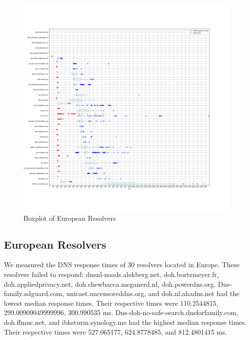 \begin{figure}[!t]
  \includegraphics[width=\linewidth]{figures/100_Europe.png}
  \caption{Boxplot of European Resolvers}
  \label{fig:EurPlots}
\end{figure}

\subsection{European Resolvers}
We measured the DNS response times of 30 resolvers located in Europe. 
These resolvers failed to respond: dnsnl-noads.alekberg.net, doh.bortzmeyer.fr, doh.appliedprivacy.net, doh.chewbacca.meganerd.nl, doh.powerdns.org.
Dns-family.adguard.com, unicast.uncensoreddns.org, and doh.nl.ahadns.net had the lowest median response times.
Their respective times were 110.2544815, 299.00909049999996, 300.990535 ms. 
Dns-doh-no-safe-search.dnsforfamily.com, doh.ffmuc.net, and ibksturm.synology.me had the highest median response times. 
Their respective times were 527.065177, 624.8778485, and 812.4801415 ms. 